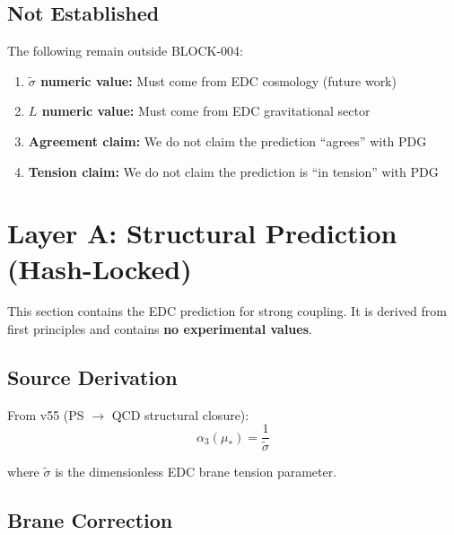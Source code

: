 \documentclass[11pt,a4paper]{article}
\theoremstyle{definition}
\begin{document}
\subsection{Not Established}
\label{subsec:not-established}

The following remain outside BLOCK-004:
\begin{enumerate}
  \item \textbf{$\tilde{\sigma}$ numeric value:} Must come from EDC cosmology (future work)
  \item \textbf{$L$ numeric value:} Must come from EDC gravitational sector
  \item \textbf{Agreement claim:} We do not claim the prediction ``agrees'' with PDG
  \item \textbf{Tension claim:} We do not claim the prediction is ``in tension'' with PDG
\end{enumerate}

\section{Layer A: Structural Prediction (Hash-Locked)}
\label{sec:layer-a}

\begin{layerabox}
This section contains the EDC prediction for strong coupling.
It is derived from first principles and contains \textbf{no experimental values}.
\end{layerabox}

\subsection{Source Derivation}
\label{subsec:source}

From v55 (PS $\to$ QCD structural closure):
\begin{equation}
\label{eq:alpha3-source}
\boxed{\alpha_3(\mu_*) = \frac{1}{\tilde{\sigma}}}
\end{equation}

where $\tilde{\sigma}$ is the dimensionless EDC brane tension parameter.

\subsection{Brane Correction}
\label{subsec:brane-correction}
\end{document}
